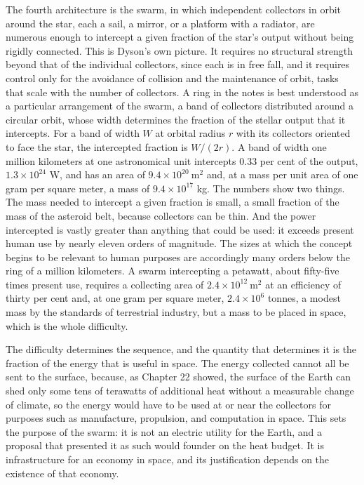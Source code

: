 The fourth architecture is the swarm, in which independent collectors in orbit around the star, each a sail, a mirror, or a platform with a radiator, are numerous enough to intercept a given fraction of the star's output without being rigidly connected. This is Dyson's own picture. It requires no structural strength beyond that of the individual collectors, since each is in free fall, and it requires control only for the avoidance of collision and the maintenance of orbit, tasks that scale with the number of collectors. A ring in the notes is best understood as a particular arrangement of the swarm, a band of collectors distributed around a circular orbit, whose width determines the fraction of the stellar output that it intercepts. For a band of width $W$ at orbital radius $r$ with its collectors oriented to face the star, the intercepted fraction is $W/(2r)$. A band of width one million kilometers at one astronomical unit intercepts $0.33$ per cent of the output, $1.3\times10^{24}$ W, and has an area of $9.4\times10^{20}\ \mathrm{m^2}$ and, at a mass per unit area of one gram per square meter, a mass of $9.4\times10^{17}$ kg. The numbers show two things. The mass needed to intercept a given fraction is small, a small fraction of the mass of the asteroid belt, because collectors can be thin. And the power intercepted is vastly greater than anything that could be used: it exceeds present human use by nearly eleven orders of magnitude. The sizes at which the concept begins to be relevant to human purposes are accordingly many orders below the ring of a million kilometers. A swarm intercepting a petawatt, about fifty-five times present use, requires a collecting area of $2.4\times10^{12}\ \mathrm{m^2}$ at an efficiency of thirty per cent and, at one gram per square meter, $2.4\times10^6$ tonnes, a modest mass by the standards of terrestrial industry, but a mass to be placed in space, which is the whole difficulty.

The difficulty determines the sequence, and the quantity that determines it is the fraction of the energy that is useful in space. The energy collected cannot all be sent to the surface, because, as Chapter 22 showed, the surface of the Earth can shed only some tens of terawatts of additional heat without a measurable change of climate, so the energy would have to be used at or near the collectors for purposes such as manufacture, propulsion, and computation in space. This sets the purpose of the swarm: it is not an electric utility for the Earth, and a proposal that presented it as such would founder on the heat budget. It is infrastructure for an economy in space, and its justification depends on the existence of that economy.

